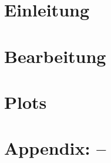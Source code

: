 \documentclass[parskip, twoside, accentcolor=tud9b, colorback, breaklinks, noresetcounter, noheadingspace, pdfencoding=unicode, 11pt, bigchapter, numbersubsubsec, numbers=noenddot, linedtoc, longdoc]{tudreport}
\begin{document}
\frontmatter
\hypersetup{pageanchor=false}
\maketitle
\hypersetup{pageanchor=true}
\cleardoublepage

%

\cleardoublepage
\pagestyle{plain}
\tableofcontents
\cleardoublepage


\pagestyle{headings}

\chapter{Einleitung}\label{chap:Kapitel1}
    
    
    
\chapter{Bearbeitung}
    
    
    

\chapter{Plots}
	
	
\pagestyle{plain}
\appendix
\newcommand{\hiddensection}[1]{
    \stepcounter{section}
    \section*{\Alph{chapter}.\arabic{section}\hspace{0.8em}{#1}}
}
\chapter{Appendix: --}
%    
\cleardoublepage


%
\cleardoublepage

\listoffigures
\cleardoublepage

\listoftables
\cleardoublepage
\end{document}
